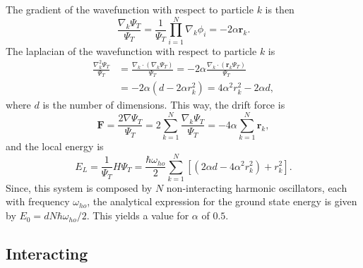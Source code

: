 \documentclass[aps,reprint,superscriptaddress,nofootinbib]{revtex4-2}
\begin{document}
    The gradient of the wavefunction with respect to particle \(k\) is then 
    \begin{equation*}
        \frac{\nabla_k \Psi_T}{\Psi_T} = \frac{1}{\Psi_T} \prod_{i=1}^N \nabla_k \phi_i = - 2 \alpha \bm r_k.
    \end{equation*}
    The laplacian of the wavefunction with respect to particle \(k\) is
    \begin{align*}
        \frac{\nabla^2_k \Psi_T}{\Psi_T} &= \frac{\nabla_k \cdot (\nabla_k \Psi_T) }{\Psi_T} = -2\alpha \frac{\nabla_k \cdot (\bm r_k \Psi_T)}{\Psi_T} \\
        &= -2\alpha (d - 2 \alpha r_k^2) = 4\alpha^2 r_k^2 - 2 \alpha d,
    \end{align*}
    where \(d\) is the number of dimensions. This way, the drift force is 
    \begin{equation*}
        \bm F = \frac{2 \nabla \Psi_T}{\Psi_T} = 2 \sum_{k=1}^N \frac{\nabla_k \Psi_T}{\Psi_T} = - 4 \alpha \sum_{k=1}^N \bm r_k,
    \end{equation*}
    and the local energy is
    \begin{equation*}
        E_L = \frac{1}{\Psi_T} H \Psi_T = \frac{\hbar \omega_{ho}}{2} \sum_{k=1}^N [(2 \alpha d - 4\alpha^2 r_k^2) + r_k^2].
    \end{equation*}
    Since, this system is composed by \(N\) non-interacting harmonic oscillators, each with frequency \(\omega_{ho}\), the analytical expression for the ground state energy is given by \(E_0 = d N \hbar \omega_{ho} / 2\). This yields a value for \(\alpha\) of \(0.5\).
    
\subsection*{Interacting}
\end{document}
